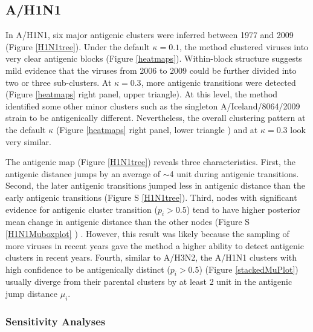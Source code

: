 \documentclass[11pt,oneside,letterpaper]{article}
\begin{document}
\subsection*{A/H1N1}
In A/H1N1, six major antigenic clusters were inferred between 1977 and 2009 (Figure \ref{H1N1tree}). 
Under the default  $\kappa=0.1$, the method clustered viruses into very clear antigenic blocks  (Figure \ref{heatmaps}). 
Within-block structure suggests mild evidence that the viruses from 2006 to 2009 could be further divided into two or three sub-clusters. 
At $\kappa=0.3$, more antigenic transitions were detected (Figure \ref{heatmaps} right panel, upper triangle).
At this level, the method identified some other minor clusters such as the singleton A/Iceland/8064/2009 strain to be antigenically different.
Nevertheless, the overall clustering pattern at the default $\kappa$ (Figure \ref{heatmaps} right panel, lower triangle ) and at $\kappa=0.3$ look very similar. 

The antigenic map (Figure \ref{H1N1tree}) reveals three characteristics.
First, the antigenic distance jumps by an average of $\sim$4 unit during antigenic transitions. 
Second, the later antigenic transitions jumped less in antigenic distance than the early antigenic transitions (Figure S \ref{H1N1tree}). 
Third, nodes with significant evidence for antigenic cluster transition ($p_i > 0.5$) tend to have higher posterior mean change in antigenic distance than the other nodes (Figure S \ref{H1N1Muboxplot} ) .
However, this result was likely because the sampling of more viruses in recent years gave the method a higher ability to detect antigenic clusters in recent years.
Fourth, similar to A/H3N2, the A/H1N1 clusters with high confidence to be antigenically distinct ($p_i > 0.5$) (Figure \ref{stackedMuPlot}) usually diverge from their parental clusters by at least 2 unit in the antigenic jump distance $\mu_i$.



\subsubsection*{Sensitivity Analyses}
\end{document}
